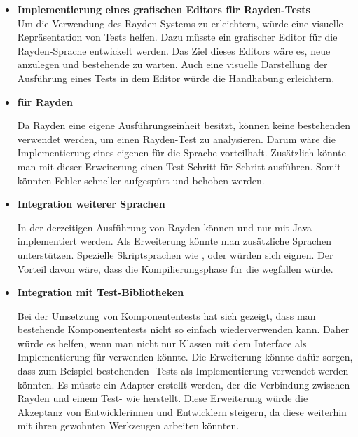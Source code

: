 \begin{itemize}
\item \textbf{Implementierung eines grafischen Editors für Rayden-Tests}\\

Um die Verwendung des Rayden-Systems zu erleichtern, würde eine visuelle Repräsentation von Tests helfen. Dazu müsste ein grafischer Editor für die Rayden-Sprache entwickelt werden. Das Ziel dieses Editors wäre es, neue  anzulegen und bestehende zu warten. Auch eine visuelle Darstellung der Ausführung eines Tests in dem Editor würde die Handhabung erleichtern.\\

\item \textbf{ für Rayden}

Da Rayden eine eigene Ausführungseinheit besitzt, können keine bestehenden  verwendet werden, um einen Rayden-Test zu analysieren. Darum wäre die Implementierung eines eigenen  für die Sprache vorteilhaft. Zusätzlich könnte man mit dieser Erweiterung einen Test Schritt für Schritt ausführen. Somit könnten Fehler schneller aufgespürt und behoben werden.\\

\item \textbf{Integration weiterer Sprachen}

In der derzeitigen Ausführung von Rayden können  und  nur mit Java implementiert werden. Als Erweiterung könnte man zusätzliche Sprachen unterstützen. Spezielle Skriptsprachen wie ,  oder  würden sich eignen. Der Vorteil davon wäre, dass die Kompilierungsphase für die  wegfallen würde. \\

\item \textbf{Integration mit Test-Bibliotheken}

Bei der Umsetzung von Komponententests hat sich gezeigt, dass man bestehende Komponententests nicht so einfach wiederverwenden kann. Daher würde es helfen, wenn man nicht nur Klassen mit dem Interface  als Implementierung für  verwenden könnte. Die Erweiterung könnte dafür sorgen, dass zum Beispiel bestehenden -Tests als Implementierung verwendet werden könnten. Es müsste ein Adapter erstellt werden, der die Verbindung zwischen Rayden und einem Test- wie  herstellt. Diese Erweiterung würde die Akzeptanz von Entwicklerinnen und Entwicklern steigern, da diese weiterhin mit ihren gewohnten Werkzeugen arbeiten könnten. 

\end{itemize}

